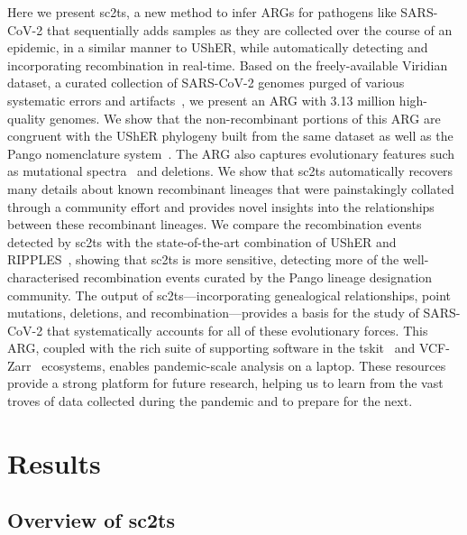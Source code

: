\documentclass[12pt]{article}
\begin{document}
Here we present sc2ts, a new method to infer ARGs for pathogens like SARS-CoV-2
that sequentially adds samples as they are collected over the course of an epidemic,
in a similar manner to UShER, while automatically detecting and incorporating recombination
in real-time. Based on the freely-available Viridian dataset, a curated
collection of SARS-CoV-2 genomes purged of various systematic errors
and artifacts~\cite{Hunt2026},
we present an ARG with 3.13 million high-quality genomes.
We show that the non-recombinant portions of this ARG are
congruent with the UShER phylogeny built
from the same dataset as well as the Pango nomenclature system~\cite{Rambaut2020}.
The ARG also captures evolutionary features such as mutational
spectra~\cite{Bloom2023} and deletions\cite{Li2023indels}.
We show that sc2ts automatically recovers many details about
known recombinant lineages that were painstakingly collated through
a community effort and provides novel insights into the relationships between these
recombinant lineages. We compare the recombination events detected by
sc2ts with the state-of-the-art combination of UShER and
RIPPLES~\cite{Turakhia2022}, showing that sc2ts is more sensitive,
detecting more of the well-characterised recombination events
curated by the Pango lineage designation community.
The output of sc2ts---incorporating
genealogical relationships, point mutations, deletions, and
recombination---provides a basis for the study of SARS-CoV-2
that systematically accounts for all of these evolutionary forces.
This ARG, coupled with the rich suite of supporting software
in the tskit~\cite{Jeffery2026population} and VCF-Zarr~\cite{Czech2025} ecosystems,
enables pandemic-scale analysis on a laptop.
These resources provide a strong platform for future research,
helping us to learn from the vast troves of data collected during the
pandemic and to prepare for the next.


\section*{Results}
\subsection*{Overview of sc2ts}
\end{document}
